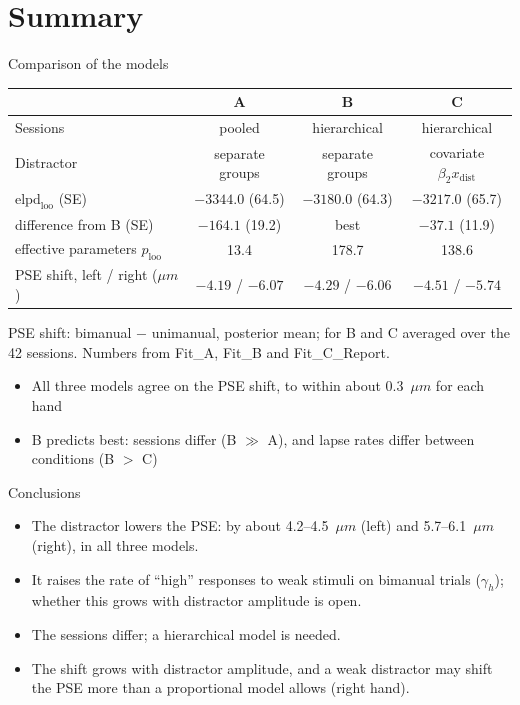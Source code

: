 \section{Summary}

\begin{frame}{Comparison of the models}
  \centering
  \begin{tabular}{lccc}
    \toprule
     & A & B & C \\
    \midrule
    Sessions & pooled & hierarchical & hierarchical \\
    Distractor & separate groups & separate groups & covariate $\beta_2 x_\text{dist}$ \\
    $\text{elpd}_\text{loo}$ (SE) & $-3344.0$ (64.5) & $-3180.0$ (64.3) & $-3217.0$ (65.7) \\
    difference from B (SE) & $-164.1$ (19.2) & best & $-37.1$ (11.9) \\
    effective parameters $p_\text{loo}$ & 13.4 & 178.7 & 138.6 \\
    PSE shift, left / right ($\mu m$) & $-4.19$ / $-6.07$ & $-4.29$ / $-6.06$ & $-4.51$ / $-5.74$ \\
    \bottomrule
  \end{tabular}

  \vspace{0.4em}
  {\scriptsize\color{muted} PSE shift: bimanual $-$ unimanual, posterior mean; for B and C averaged
  over the 42 sessions. Numbers from Fit\_A, Fit\_B and Fit\_C\_Report.}

  \vfill
  \raggedright
  \begin{itemize}
    \item All three models agree on the PSE shift, to within about 0.3~$\mu m$ for each hand
    \item B predicts best: sessions differ (B $\gg$ A), and lapse rates differ
          between conditions (B $>$ C)
  \end{itemize}
\end{frame}

\begin{frame}{Conclusions}
  \begin{itemize}
    \item The distractor lowers the PSE: by about 4.2--4.5~$\mu m$ (left) and 5.7--6.1~$\mu m$
          (right), in all three models.
    \item It raises the rate of ``high'' responses to weak stimuli on bimanual trials
          ($\gamma_h$); whether this grows with distractor amplitude is open.
    \item The sessions differ; a hierarchical model is needed.
    \item The shift grows with distractor amplitude, and a weak distractor may shift the PSE
          more than a proportional model allows (right hand).
  \end{itemize}
\end{frame}

